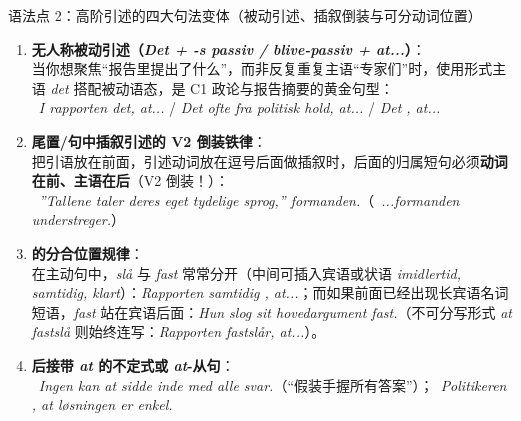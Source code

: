 \begin{grammatikbox}{语法点 2：高阶引述的四大句法变体（被动引述、插叙倒装与可分动词位置）}
\begin{enumerate}
  \item \textbf{无人称被动引述（\textit{Det + -s passiv / blive-passiv + at...}）}：\\
    当你想聚焦“报告里提出了什么”，而非反复重复主语“专家们”时，使用形式主语 \textit{det} 搭配被动语态，是 C1 政论与报告摘要的黄金句型：\\
    \ \textit{I rapporten  det, at...} / \textit{Det  ofte fra politisk hold, at...} / \textit{Det , at...}
  \item \textbf{尾置/句中插叙引述的 V2 倒装铁律}：\\
    把引语放在前面，引述动词放在逗号后面做插叙时，后面的归属短句必须\textbf{动词在前、主语在后}（V2 倒装！）：\\
    \ \textit{”Tallene taler deres eget tydelige sprog,”  formanden.}（\ \textit{...formanden understreger.}）
  \item \textbf{ 的分合位置规律}：\\
    在主动句中，\textit{slå} 与 \textit{fast} 常常分开（中间可插入宾语或状语 \textit{imidlertid, samtidig, klart}）：\textit{Rapporten  samtidig , at...}；而如果前面已经出现长宾语名词短语，\textit{fast} 站在宾语后面：\textit{Hun slog sit hovedargument fast.}（不可分写形式 \textit{at fastslå} 则始终连写：\textit{Rapporten fastslår, at...}）。
  \item \textbf{ 后接带 \textit{at} 的不定式或 \textit{at}-从句}：\\
    \ \textit{Ingen kan  at sidde inde med alle svar.}（“假装手握所有答案”）；\ \textit{Politikeren , at løsningen er enkel.}
\end{enumerate}
\end{grammatikbox}

